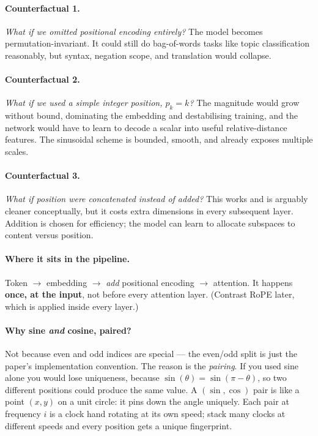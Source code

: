 \documentclass[11pt,a4paper]{article}
\begin{document}
\paragraph{Counterfactual 1.} \emph{What if we omitted positional encoding entirely?} The
model becomes permutation-invariant. It could still do bag-of-words tasks like topic
classification reasonably, but syntax, negation scope, and translation would collapse.

\paragraph{Counterfactual 2.} \emph{What if we used a simple integer position, $p_k = k$?}
The magnitude would grow without bound, dominating the embedding and destabilising training,
and the network would have to learn to decode a scalar into useful relative-distance
features. The sinusoidal scheme is bounded, smooth, and already exposes multiple scales.

\paragraph{Counterfactual 3.} \emph{What if position were concatenated instead of added?}
This works and is arguably cleaner conceptually, but it costs extra dimensions in every
subsequent layer. Addition is chosen for efficiency; the model can learn to allocate
subspaces to content versus position.

\paragraph{Where it sits in the pipeline.} Token $\rightarrow$ embedding $\rightarrow$
\emph{add} positional encoding $\rightarrow$ attention. It happens \textbf{once, at the input},
not before every attention layer. (Contrast RoPE later, which is applied inside every layer.)

\paragraph{Why sine \emph{and} cosine, paired?} Not because even and odd indices are special
--- the even/odd split is just the paper's implementation convention. The reason is the
\emph{pairing}. If you used sine alone you would lose uniqueness, because
$\sin(\theta) = \sin(\pi - \theta)$, so two different positions could produce the same value.
A $(\sin, \cos)$ pair is like a point $(x,y)$ on a unit circle: it pins down the angle
uniquely. Each pair at frequency $i$ is a clock hand rotating at its own speed; stack many
clocks at different speeds and every position gets a unique fingerprint.
\end{document}
